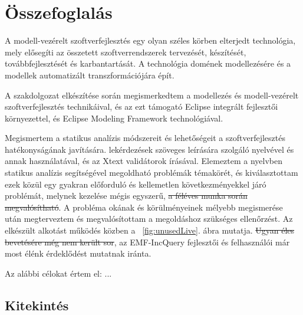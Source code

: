 \chapter{Összefoglalás}
\label{chap:summary}

A modell-vezérelt szoftverfejlesztés egy olyan széles körben elterjedt technológia, mely elősegíti az összetett szoftverrendszerek tervezését, készítését, továbbfejlesztését és karbantartását.
A technológia domének modellezésére és a modellek automatizált transzformációjára épít.

A szakdolgozat elkészítése során megismerkedtem a modellezés és modell-vezérelt szoftverfejlesztés technikáival, és az ezt támogató Eclipse integrált fejlesztői környezettel, és Eclipse Modeling Framework technológiával.

Megismertem a statikus analízis módszereit és lehetőségeit a szoftverfejlesztés hatékonyságának javítására.
  lekérdezések szöveges leírására szolgáló nyelvével és annak használatával, és az Xtext validátorok írásával.
Elemeztem a nyelvben statikus analízis segítségével megoldható problémák témakörét, és kiválasztottam ezek közül egy gyakran előforduló és kellemetlen következményekkel járó problémát, melynek kezelése mégis egyszerű, \sout{a féléves munka során megvalósítható}.
A probléma okának és körülményeinek mélyebb megismerése után megterveztem és megvalósítottam a megoldáshoz szükséges ellenőrzést.
Az elkészült alkotást működés közben a ~\ref{fig:unusedLive}. ábra mutatja.
\sout{Ugyan éles bevetésére még nem került sor}, az EMF-IncQuery fejlesztői és felhasználói már most élénk érdeklődést mutatnak iránta.

Az alábbi célokat értem el: ...


\section{Kitekintés}

